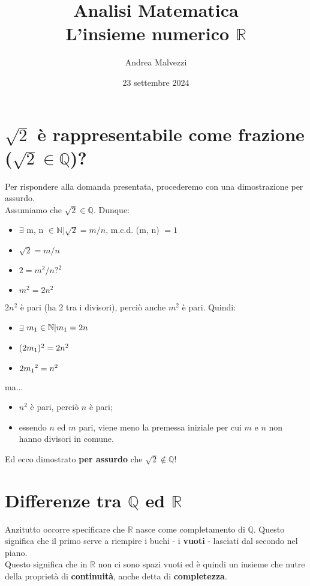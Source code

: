 \documentclass[12pt]{article}
\title{\textbf{Analisi Matematica\\L'insieme numerico $\mathbb{R}$}}
\date{23 settembre 2024}
\author{Andrea Malvezzi}
\begin{document}
\maketitle
\pagebreak
\section{$\sqrt{2}$ è rappresentabile come frazione\\($\sqrt{2} \in \mathbb{Q}$)?}
Per rispondere alla domanda presentata, procederemo con una dimostrazione per assurdo.\\
Assumiamo che $\sqrt{2} \in \mathbb{Q}$. Dunque:
\begin{itemize}
    \item $\exists$ m, n $\in \mathbb{N} | \sqrt{2} = m/n$, m.c.d. (m, n) $= 1$
    \item $\sqrt{2} = m/n$
    \item $2 = m^2/n?^2$
    \item $m^2 = 2n^2$ 
\end{itemize}
$2n^2$ è pari (ha 2 tra i divisori), perciò anche $m^2$ è pari. Quindi:
\begin{itemize}
    \item $\exists$ $m\textsubscript{1} \in \mathbb{N} | m\textsubscript{1} = 2n$
    \item ($2m\textsubscript{1})^2 = 2n^2$
    \item $2m\textsubscript{1}^2 = n^2$  
\end{itemize}
ma...
\begin{itemize}
    \item $n^2$ è pari, perciò $n$ è pari;
    \item essendo $n$ ed $m$ pari, viene meno la premessa iniziale per cui $m$ e $n$ non hanno divisori in comune.
\end{itemize}
Ed ecco dimostrato \textbf{per assurdo} che $\sqrt{2} \notin \mathbb{Q}$!
\section{Differenze tra $\mathbb{Q}$ ed $\mathbb{R}$}
Anzitutto occorre specificare che $\mathbb{R}$ nasce come completamento di $\mathbb{Q}$. Questo significa che il primo serve a riempire i buchi - i \textbf{vuoti} - lasciati dal secondo nel piano.\\
Questo significa che in $\mathbb{R}$ non ci sono spazi vuoti ed è quindi un insieme che nutre della proprietà di \textbf{continuità}, anche detta di \textbf{completezza}.
\end{document}

